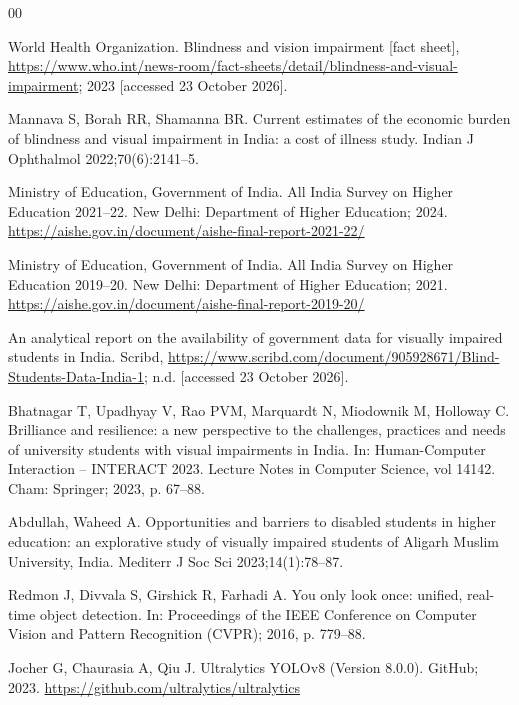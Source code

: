 \documentclass[3p,times,procedia]{elsarticle}
\begin{document}
\begin{thebibliography}{00}

World Health Organization. Blindness and vision impairment [fact sheet],
\url{https://www.who.int/news-room/fact-sheets/detail/blindness-and-visual-impairment};
2023 [accessed 23 October 2026].

Mannava S, Borah RR, Shamanna BR. Current estimates of the economic burden
of blindness and visual impairment in India: a cost of illness study. Indian
J Ophthalmol 2022;70(6):2141--5.

Ministry of Education, Government of India. All India Survey on Higher
Education 2021--22. New Delhi: Department of Higher Education; 2024.
\url{https://aishe.gov.in/document/aishe-final-report-2021-22/}

Ministry of Education, Government of India. All India Survey on Higher
Education 2019--20. New Delhi: Department of Higher Education; 2021.
\url{https://aishe.gov.in/document/aishe-final-report-2019-20/}

An analytical report on the availability of government data for visually
impaired students in India. Scribd,
\url{https://www.scribd.com/document/905928671/Blind-Students-Data-India-1};
n.d. [accessed 23 October 2026].

Bhatnagar T, Upadhyay V, Rao PVM, Marquardt N, Miodownik M, Holloway C.
Brilliance and resilience: a new perspective to the challenges, practices and
needs of university students with visual impairments in India. In:
Human-Computer Interaction -- INTERACT 2023. Lecture Notes in Computer
Science, vol 14142. Cham: Springer; 2023, p. 67--88.

Abdullah, Waheed A. Opportunities and barriers to disabled students in
higher education: an explorative study of visually impaired students of
Aligarh Muslim University, India. Mediterr J Soc Sci 2023;14(1):78--87.

Redmon J, Divvala S, Girshick R, Farhadi A. You only look once: unified,
real-time object detection. In: Proceedings of the IEEE Conference on
Computer Vision and Pattern Recognition (CVPR); 2016, p. 779--88.

Jocher G, Chaurasia A, Qiu J. Ultralytics YOLOv8 (Version 8.0.0). GitHub;
2023. \url{https://github.com/ultralytics/ultralytics}


\end{thebibliography}
\end{document}
